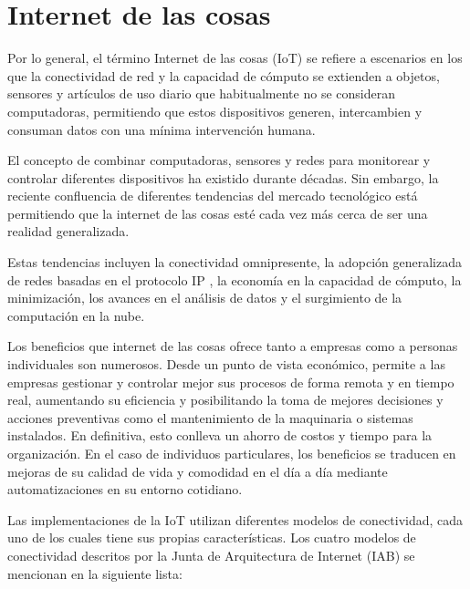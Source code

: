 

\section{Internet de las cosas}

Por lo general, el término Internet de las cosas (IoT) se refiere a escenarios en los que la conectividad de red y la capacidad de cómputo se extienden a objetos, sensores y artículos de uso diario que habitualmente no se consideran computadoras, permitiendo que estos dispositivos generen, intercambien y consuman datos con una mínima intervención humana.  

El concepto de combinar computadoras, sensores y redes para monitorear y controlar diferentes dispositivos ha existido durante décadas. Sin embargo, la reciente confluencia de diferentes tendencias del mercado tecnológico está permitiendo que la internet de las cosas esté cada vez más cerca de ser una realidad generalizada.   

Estas tendencias incluyen la conectividad omnipresente, la adopción generalizada de redes basadas en el protocolo IP \citep{WEBSITE:9}, la economía en la capacidad de cómputo, la minimización, los avances en el análisis de datos y el surgimiento de la computación en la nube.

Los beneficios que internet de las cosas ofrece tanto a empresas como a personas individuales son numerosos. Desde un punto de vista económico, permite a las empresas gestionar y controlar mejor sus procesos de forma remota y en tiempo real, aumentando su eficiencia y posibilitando la toma de mejores decisiones y acciones preventivas como el mantenimiento de la maquinaria o sistemas instalados. En definitiva, esto conlleva un ahorro de costos y tiempo para la organización. En el caso de individuos particulares, los beneficios se traducen en mejoras de su calidad de vida y comodidad en el día a día mediante automatizaciones en su entorno cotidiano.

Las implementaciones de la IoT utilizan diferentes modelos de conectividad, cada uno de los cuales tiene sus propias características. Los cuatro modelos de conectividad descritos por la Junta de Arquitectura de Internet (IAB)\citep{WEBSITE:5} se mencionan en la siguiente lista:

